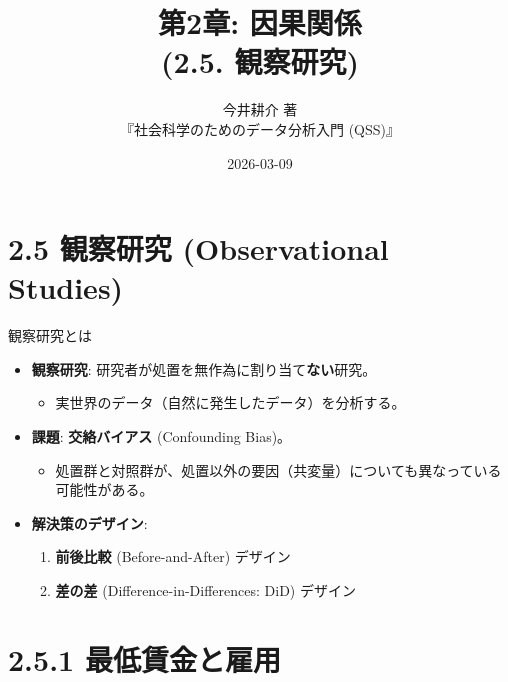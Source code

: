 \documentclass[
  ignorenonframetext,
]{beamer}
\title{第2章: 因果関係\\
(2.5. 観察研究)}
\subtitle{今井耕介 著\\
『社会科学のためのデータ分析入門 (QSS)』}
\author{}
\date{\vspace{-2.5em}2026-03-09}
\providecommand{\tightlist}{%
  \setlength{\itemsep}{0pt}\setlength{\parskip}{0pt}}
\begin{document}
\frame{\titlepage}

\hypertarget{ux89b3ux5bdfux7814ux7a76-observational-studies}{%
\section{2.5 観察研究 (Observational
Studies)}\label{ux89b3ux5bdfux7814ux7a76-observational-studies}}

\begin{frame}{観察研究とは}
\protect\hypertarget{ux89b3ux5bdfux7814ux7a76ux3068ux306f}{}
\begin{itemize}
\tightlist
\item
  \textbf{観察研究}: 研究者が処置を無作為に割り当て\textbf{ない}研究。

  \begin{itemize}
  \tightlist
  \item
    実世界のデータ（自然に発生したデータ）を分析する。
  \end{itemize}
\item
  \textbf{課題}: \textbf{交絡バイアス} (Confounding Bias)。

  \begin{itemize}
  \tightlist
  \item
    処置群と対照群が、処置以外の要因（共変量）についても異なっている可能性がある。
  \end{itemize}
\item
  \textbf{解決策のデザイン}:

  \begin{enumerate}
  \tightlist
  \item
    \textbf{前後比較} (Before-and-After) デザイン
  \item
    \textbf{差の差} (Difference-in-Differences: DiD) デザイン
  \end{enumerate}
\end{itemize}
\end{frame}

\hypertarget{ux6700ux4f4eux8cc3ux91d1ux3068ux96c7ux7528}{%
\section{2.5.1
最低賃金と雇用}\label{ux6700ux4f4eux8cc3ux91d1ux3068ux96c7ux7528}}
\end{document}
